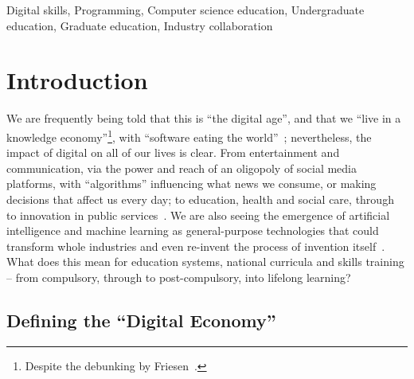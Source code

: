 \documentclass[conference]{IEEEtran}
\begin{document}
\begin{IEEEkeywords}
Digital skills, Programming, Computer science education, Undergraduate
education, Graduate education, Industry collaboration
\end{IEEEkeywords}

\section{Introduction}


We are frequently being told that this is ``the digital age'', and
that we ``live in a knowledge economy''\footnote{Despite the debunking
by Friesen~\cite{Friesen2008}.}, with ``software eating the
world''~\cite{andreessen:2011}; nevertheless, the impact of digital on
all of our lives is clear. From entertainment and communication, via
the power and reach of an oligopoly of social media platforms, with
``algorithms'' influencing what news we consume, or making decisions
that affect us every day; to education, health and social care,
through to innovation in public services~\cite{ecdsmsuk:2018}. We are
also seeing the emergence of artificial intelligence and machine
learning as general-purpose technologies that could transform whole
industries and even re-invent the process of invention
itself~\cite{brynjolfsson-et-al:2018,dwivedi-et-al:ijim2019}. What
does this mean for education systems, national curricula and skills
training -- from compulsory, through to post-compulsory, into lifelong
learning?

\subsection{Defining the ``Digital Economy''}
\end{document}
